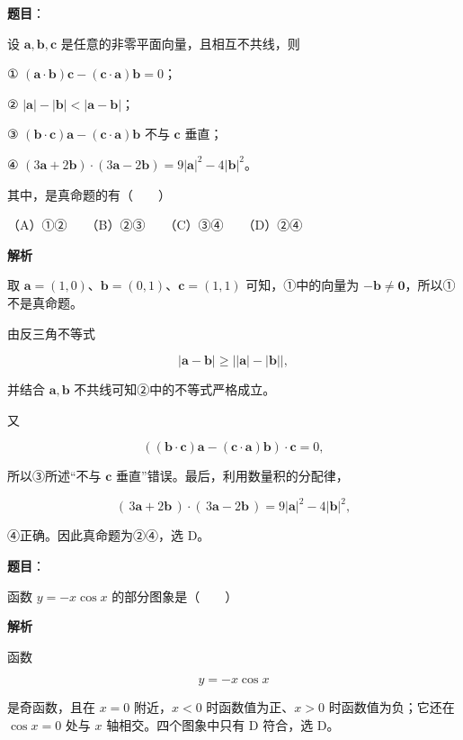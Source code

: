 \begin{answer}

\textbf{题目}：

设 $\boldsymbol a,\boldsymbol b,\boldsymbol c$ 是任意的非零平面向量，且相互不共线，则

① $(\boldsymbol a\cdot\boldsymbol b)\boldsymbol c-(\boldsymbol c\cdot\boldsymbol a)\boldsymbol b=0$；

② $|\boldsymbol a|-|\boldsymbol b|<|\boldsymbol a-\boldsymbol b|$；

③ $(\boldsymbol b\cdot\boldsymbol c)\boldsymbol a-(\boldsymbol c\cdot\boldsymbol a)\boldsymbol b$ 不与 $\boldsymbol c$ 垂直；

④ $(3\boldsymbol a+2\boldsymbol b)\cdot(3\boldsymbol a-2\boldsymbol b)=9|\boldsymbol a|^2-4|\boldsymbol b|^2$。

其中，是真命题的有\mbox{（　　）}

（A）①②　　（B）②③　　（C）③④　　（D）②④

\textbf{解析}

取 $\boldsymbol a=(1,0)$、$\boldsymbol b=(0,1)$、$\boldsymbol c=(1,1)$ 可知，①中的向量为 $-\boldsymbol b\ne\boldsymbol0$，所以①不是真命题。

由反三角不等式

\nopagebreak[4]
\[
|\boldsymbol a-\boldsymbol b|\ge\bigl||\boldsymbol a|-|\boldsymbol b|\bigr|,
\]

并结合 $\boldsymbol a,\boldsymbol b$ 不共线可知②中的不等式严格成立。

又

\nopagebreak[4]
\[
\left((\boldsymbol b\cdot\boldsymbol c)\boldsymbol a-(\boldsymbol c\cdot\boldsymbol a)\boldsymbol b\right)\cdot\boldsymbol c=0,
\]

所以③所述“不与 $\boldsymbol c$ 垂直”错误。最后，利用数量积的分配律，

\nopagebreak[4]
\[
(\,3\boldsymbol a+2\boldsymbol b\,)\cdot(\,3\boldsymbol a-2\boldsymbol b\,)
=9|\boldsymbol a|^2-4|\boldsymbol b|^2,
\]

④正确。因此真命题为②④，选 D。


\end{answer}
\begin{answer}

\textbf{题目}：

函数 $y=-x\cos x$ 的部分图象是\mbox{（　　）}
\nopagebreak[4]
\begin{center}\end{center}
\nopagebreak[4]
\textbf{解析}

函数

\nopagebreak[4]
\[
y=-x\cos x
\]

是奇函数，且在 $x=0$ 附近，$x<0$ 时函数值为正、$x>0$ 时函数值为负；它还在 $\cos x=0$ 处与 $x$ 轴相交。四个图象中只有 D 符合，选 D。


\end{answer}
